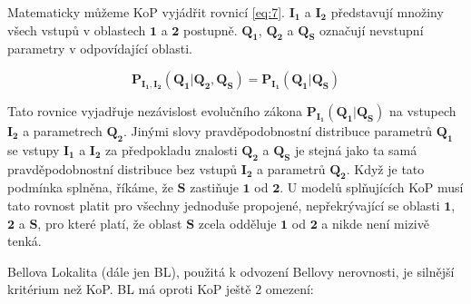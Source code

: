 Matematicky můžeme KoP vyjádřit rovnicí \ref{eq:7}. $\bm{I_{1}}$ a $\bm{I_{2}}$ představují množiny všech vstupů v oblastech $\bm{1}$ a $\bm{2}$ postupně. $\bm{Q_{1}}$, $\bm{Q_{2}}$ a $\bm{Q_{S}}$ označují nevstupní parametry v odpovídající oblasti.

\begin{equation}
    \bm{P_{I_{1},I_{2}}(Q_{1}|Q_{2}, Q_{S}) = P_{I_{1}}(Q_{1}|Q_{S})}
    \label{eq:7}
\end{equation}

Tato rovnice vyjadřuje nezávislost evolučního zákona $\bm{P_{I_{1}}(Q_{1}|Q_{S})}$ na vstupech $\bm{I_{2}}$ a parametrech $\bm{Q_{2}}$. Jinými slovy pravděpodobnostní distribuce parametrů $\bm{Q_{1}}$ se vstupy $\bm{I_{1}}$ a $\bm{I_{2}}$ za předpokladu znalosti $\bm{Q_{2}}$ a $\bm{Q_{S}}$ je stejná jako ta samá pravděpodobnostní distribuce bez vstupů $\bm{I_{2}}$ a parametrů $\bm{Q_{2}}$. Když je tato podmínka splněna, říkáme, že $\bm{S}$ zastiňuje $\bm{1}$ od $\bm{2}$. U modelů splňujících KoP musí tato rovnost platit pro všechny jednoduše propojené, nepřekrývající se oblasti $\bm{1}$, $\bm{2}$ a $\bm{S}$, pro které platí, že oblast $\bm{S}$ zcela odděluje $\bm{1}$ od $\bm{2}$ a nikde není mizivě tenká.

Bellova Lokalita (dále jen BL), použitá k odvození Bellovy nerovnosti, je silnější kritérium než KoP. BL má oproti KoP ještě 2 omezení:

